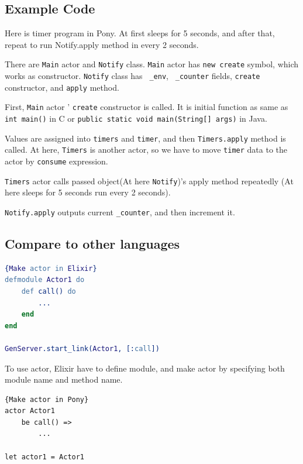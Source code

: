 \documentclass{article}
\begin{document}
\begin{multicols}{2}
\subsection{Example Code}



Here is timer program in Pony.
At first sleeps for 5 seconds, and after that, repeat to run Notify.apply method in every 2 seconds.

There are \texttt{Main} actor and \texttt{Notify} class. 
\texttt{Main} actor has \texttt{new create} symbol, which works as constructor.
\texttt{Notify} class has \texttt{ \_env}, \texttt{ \_counter} fields, \texttt{create} constructor, and \texttt{apply} method.

First, \texttt{Main} actor ' \texttt{create} constructor is called. It is initial function as same as \texttt{int main()} in C or \texttt{public static void main(String[] args)} in Java. 

Values are assigned into \texttt{timers} and \texttt{timer}, and then \texttt{Timers.apply} method is called. 
At here, \texttt{Timers} is another actor, so we have to move \texttt{timer} data to the actor by \texttt{consume} expression.

 \texttt{Timers} actor calls passed object(At here \texttt{Notify})'s apply method repeatedly (At here sleeps for 5 seconds run every 2 seconds). 
 
\texttt{Notify.apply} outputs current \texttt{\_counter}, and then increment it.




\subsection{Compare to other languages}

\begin{lstlisting}[language=Erlang]{Make actor in Elixir}
defmodule Actor1 do
	def call() do
		...
	end	
end	

GenServer.start_link(Actor1, [:call])
\end{lstlisting}

To use actor, Elixir\cite{elixir} have to define module, and make actor by specifying both module name and method name.

\begin{lstlisting}{Make actor in Pony}
actor Actor1
	be call() =>
		...
		
let actor1 = Actor1		
\end{lstlisting}


\end{multicols}
\end{document}
